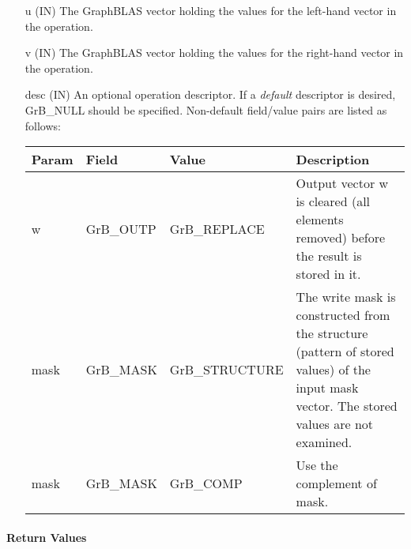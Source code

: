 \begin{itemize}[leftmargin=1.1in]
    \item[{\sf u}]    ({\sf IN}) The GraphBLAS vector holding the values for
    the left-hand vector in the operation.

    \item[{\sf v}]    ({\sf IN}) The GraphBLAS vector holding the values for
    the right-hand vector in the operation.

    \item[{\sf desc}] ({\sf IN}) An optional operation descriptor. If
    a \emph{default} descriptor is desired, {\sf GrB\_NULL} should be
    specified. Non-default field/value pairs are listed as follows:  \\

    \hspace*{-2em}\begin{tabular}{lllp{2.7in}}
        Param & Field  & Value & Description \\
        \hline
        {\sf w}    & {\sf GrB\_OUTP} & {\sf GrB\_REPLACE} & Output vector {\sf w}
        is cleared (all elements removed) before the result is stored in it.\\

        {\sf mask} & {\sf GrB\_MASK} & {\sf GrB\_STRUCTURE}   & The write mask is
        constructed from the structure (pattern of stored values) of the input
        {\sf mask} vector. The stored values are not examined.\\

        {\sf mask} & {\sf GrB\_MASK} & {\sf GrB\_COMP}   & Use the 
        complement of {\sf mask}. \\
    \end{tabular}
\end{itemize}

\paragraph{Return Values}

